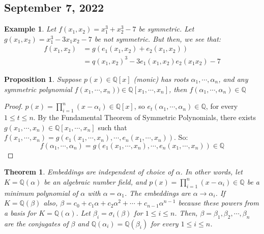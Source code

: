 \documentclass{article}
\newcommand{\Q}{\mathbb{Q}}
\newtheorem{theorem}{Theorem}
\newtheorem{example}{Example}
\newtheorem{proposition}{Proposition}
\begin{document}
\subsection{September 7, 2022}
\begin{example}
Let $f(x_1,x_2)=x_1^3+x_2^3-7$ be symmetric. Let $g(x_1,x_2)=x_1^3-3x_1x_2-7$ be not symmetric. But then, we see that:
\begin{align*}
    f(x_1,x_2)&=g(e_1(x_1,x_2)+e_2(x_1,x_2))\\
    &=q(x_1,x_2)^3-3e_1(x_1,x_2)e_2(x_1x_2)-7
\end{align*}
\end{example}
\begin{proposition}
Suppose $p(x)\in\Q[x]$ (monic) has roots $\alpha_1,\cdots,\alpha_n$, and any symmetric polynomial $f(x_1,\cdots, x_n))\in\Q[x_1,\cdots,x_n]$, then $f(\alpha_1,\cdots,\alpha_n)\in\Q$
\end{proposition}
\begin{proof}
$p(x)=\displaystyle\prod_{i=1}^n(x-\alpha_i)\in\Q[x]$, so $e_t(\alpha_1,\cdots, \alpha_n)\in\Q$, for every $1\leq t\leq n$. By the Fundamental Theorem of Symmetric Polynomials, there exists $g(x_1,\cdots, x_n)\in\Q[x_1,\cdots, x_n]$ such that $f(x_1,\cdots, x_n)=g(e_1(x_1,\cdots, x_n),\cdots, e_n(x_1,\cdots, x_n))$. So:
$$f(\alpha_1,\cdots, \alpha_n)=g(e_1(x_1,\cdots, x_n),\cdots, e_n(x_1,\cdots, x_n))\in\Q$$
\end{proof}
\begin{theorem}
Embeddings are independent of choice of $\alpha$. In other words, let $K=\Q(\alpha)$ be an algebraic number field, and $p(x)=\displaystyle\prod_{i=1}^n(x-\alpha_i)\in\Q$ be a minimum polynomial of $\alpha$ with $\alpha=\alpha_1$. The embeddings are $\alpha\rightarrow \alpha_i$. If $K=\Q(\beta)$ also, $\beta=c_0+c_1\alpha+c_2\alpha^2+\cdots +c_{n-1}\alpha^{n-1}$ because these powers from a basis for $K=\Q(\alpha)$. Let $\beta_i=\sigma_i(\beta)$ for $1\leq i\leq n$. Then, $\beta=\beta_1,\beta_2,\cdots, \beta_n$ are the conjugates of $\beta$ and $\Q(\alpha_i)=\Q(\beta_i)$ for every $1\leq i\leq n$.
\end{theorem}
\end{document}

